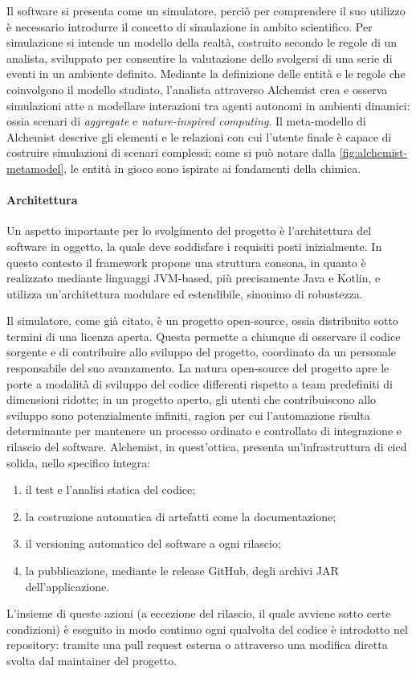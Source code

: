 Il software si presenta come un simulatore, perciò per comprendere il suo utilizzo è necessario introdurre il concetto di simulazione in ambito scientifico. Per simulazione si intende un modello della realtà, costruito secondo le regole di un analista, sviluppato per consentire la valutazione dello svolgersi di una serie di eventi in un ambiente definito. Mediante la definizione delle entità e le regole che coinvolgono il modello studiato, l'analista attraverso Alchemist crea e osserva simulazioni atte a modellare interazioni tra agenti autonomi in ambienti dinamici: ossia scenari di \textit{aggregate} e \textit{nature-inspired computing}. Il meta-modello di Alchemist descrive gli elementi e le relazioni con cui l'utente finale è capace di costruire simulazioni di scenari complessi; come si può notare dalla \cref{fig:alchemist-metamodel}, le entità in gioco sono ispirate ai fondamenti della chimica. 

\paragraph{Architettura} Un aspetto importante per lo svolgimento del progetto è l'architettura del software in oggetto, la quale deve soddisfare i requisiti posti inizialmente. In questo contesto il framework propone una struttura consona, in quanto è realizzato mediante linguaggi JVM-based, più precisamente Java e Kotlin, e utilizza un'architettura modulare ed estendibile, sinonimo di robustezza. 

Il simulatore, come già citato, è un progetto open-source, ossia distribuito sotto termini di una licenza aperta. Questa permette a chiunque di osservare il codice sorgente e di contribuire allo sviluppo del progetto, coordinato da un personale responsabile del suo avanzamento. La natura open-source del progetto apre le porte a modalità di sviluppo del codice differenti rispetto a team predefiniti di dimensioni ridotte; in un progetto aperto, gli utenti che contribuiscono allo sviluppo sono potenzialmente infiniti, ragion per cui l'automazione risulta determinante per mantenere un processo ordinato e controllato di integrazione e rilascio del software. Alchemist, in quest'ottica, presenta un'infrastruttura di \ac{cicd} solida, nello specifico integra:
\begin{enumerate}
	\item il test e l'analisi statica del codice;
	\item la costruzione automatica di artefatti come la documentazione;
	\item il versioning automatico del software a ogni rilascio;
	\item la pubblicazione, mediante le release GitHub, degli archivi JAR dell'applicazione.
\end{enumerate}
L'insieme di queste azioni (a eccezione del rilascio, il quale avviene sotto certe condizioni) è eseguito in modo continuo ogni qualvolta del codice è introdotto nel repository: tramite una pull request esterna o attraverso una modifica diretta svolta dal maintainer del progetto.

